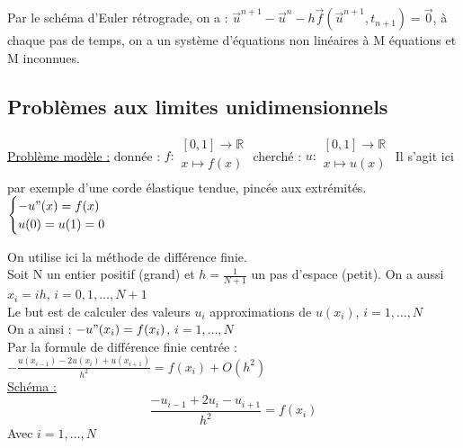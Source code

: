 \documentclass[../main.tex]{subfiles}
\begin{document}
Par le schéma d'Euler rétrograde, on a : $\Vec{u}^{n+1} - \Vec{u}^n - h\Vec{f}(\Vec{u}^{n+1}, t_{n+1}) = \Vec{0}$, à chaque pas de temps, on a un système d'équations non linéaires à M équations et M inconnues.\\

\subsection{Problèmes aux limites unidimensionnels}
\quad \underline{Problème modèle :} donnée : $f:\begin{matrix}
    [0,1] \rightarrow \mathbb{R}\\
    x \mapsto f(x)\\
\end{matrix}$ cherché : $ u : \begin{matrix}
    [0,1] \rightarrow \mathbb{R}\\
    x \mapsto u(x)\\
\end{matrix}$ Il s'agit ici par exemple d'une corde élastique tendue, pincée aux extrémités.\\
$\begin{cases}
    -u"(x) = f(x)\\
    u(0) = u(1)=0 \\
\end{cases}$

On utilise ici la méthode de différence finie.\\

Soit N un entier positif (grand) et $h = \frac{1}{N+1}$ un pas d'espace (petit). On a aussi $x_i = ih$, $i=0,1,\dots, N+1$\\
Le but est de calculer des valeurs $u_i$ approximations de $u(x_i)$, $i=1,\dots, N$\\
On a ainsi : $-u"(x_i) = f(x_i)$, $i=1,\dots, N$\\
Par la formule de différence finie centrée : $-\frac{u(x_{i-1})-2u(x_i)+u(x_{i+1})}{h^2} = f(x_i)+O(h^2)$\\

\quad \underline{Schéma :}\\
\begin{equation}
    \frac{-u_{i-1}+2u_i-u_{i+1}}{h^2} = f(x_i)
\end{equation}
Avec $i=1,\dots, N$\\
\end{document}
